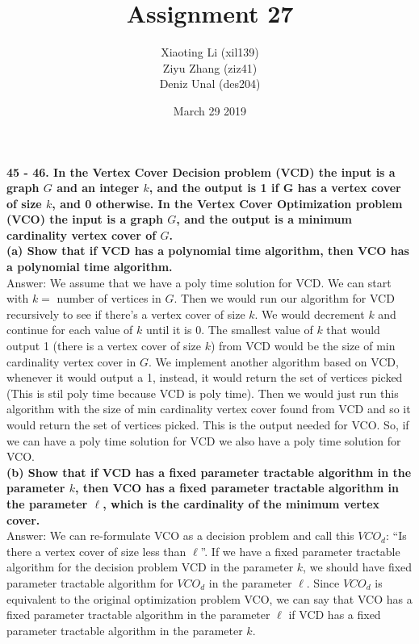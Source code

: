 \documentclass{article}
\title{Assignment 27}
\author{Xiaoting Li (xil139) \\
Ziyu Zhang (ziz41) \\
Deniz Unal (des204)}
\date{March 29 2019}
\begin{document}
\maketitle
\noindent
\textbf{45 - 46. In the Vertex Cover Decision problem (VCD) the input is a graph $G$ and an integer $k$, and the output is 1 if G has a vertex cover of size $k$, and 0 otherwise. In the Vertex Cover Optimization problem (VCO) the input is a graph $G$, and the output is a minimum cardinality vertex cover of $G$.} \\ \newline
\textbf{(a) Show that if VCD has a polynomial time algorithm, then VCO has a polynomial time algorithm.} \\ \newline
Answer: We assume that we have a poly time solution for VCD. We can start with $k =$ number of vertices in $G$. Then we would run our algorithm for VCD recursively to see if there's a vertex cover of size $k$. We would decrement $k$ and continue for each value of $k$ until it is 0. The smallest value of $k$ that would output 1 (there is a vertex cover of size $k$) from VCD would be the size of min cardinality vertex cover in $G$. We implement another algorithm based on VCD, whenever it would output a 1, instead, it would return the set of vertices picked (This is stil poly time because VCD is poly time). Then we would just run this algorithm with the size of min cardinality vertex cover found from VCD and so it would return the set of vertices picked. This is the output needed for VCO. So, if we can have a poly time solution for VCD we also have a poly time solution for VCO.\\ \newline
\textbf{(b) Show that if VCD has a fixed parameter tractable algorithm in the parameter $k$, then VCO has a fixed parameter tractable algorithm in the parameter $\ell$, which is the cardinality of the minimum vertex cover.} \\ \newline
Answer: We can re-formulate VCO as a decision problem and call this $VCO_d$: ``Is there a vertex cover of size less than $\ell$''.  If we have a fixed parameter tractable algorithm for the decision problem VCD in the parameter $k$, we should have fixed parameter tractable algorithm for $VCO_d$ in the parameter $\ell$. Since $VCO_d$ is equivalent to the original optimization problem VCO, we can say that VCO has a fixed parameter tractable algorithm in the parameter $\ell$ if VCD has a fixed parameter tractable algorithm in the parameter $k$.\\ \newline
\end{document}
